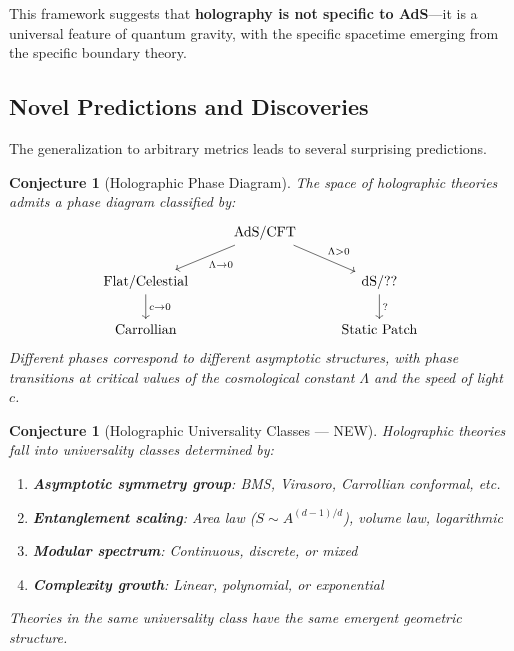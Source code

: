 \documentclass[12pt,a4paper]{article}
\newtheorem{conjecture}[theorem]{Conjecture}
\begin{document}
This framework suggests that \textbf{holography is not specific to AdS}---it is a universal feature of quantum gravity, with the specific spacetime emerging from the specific boundary theory.

\subsection{Novel Predictions and Discoveries}

The generalization to arbitrary metrics leads to several surprising predictions.

\begin{conjecture}[Holographic Phase Diagram]
The space of holographic theories admits a phase diagram classified by:
\begin{equation}
\begin{tikzcd}
& \text{AdS/CFT} \arrow[dl, "\Lambda \to 0"] \arrow[dr, "\Lambda > 0"] & \\
\text{Flat/Celestial} \arrow[d, "c \to 0"] & & \text{dS/??} \arrow[d, "?"] \\
\text{Carrollian} & & \text{Static Patch}
\end{tikzcd}
\end{equation}
Different phases correspond to different asymptotic structures, with phase transitions at critical values of the cosmological constant $\Lambda$ and the speed of light $c$.
\end{conjecture}

\begin{conjecture}[Holographic Universality Classes --- NEW]
Holographic theories fall into universality classes determined by:
\begin{enumerate}
    \item \textbf{Asymptotic symmetry group}: BMS, Virasoro, Carrollian conformal, etc.
    \item \textbf{Entanglement scaling}: Area law ($S \sim A^{(d-1)/d}$), volume law, logarithmic
    \item \textbf{Modular spectrum}: Continuous, discrete, or mixed
    \item \textbf{Complexity growth}: Linear, polynomial, or exponential
\end{enumerate}
Theories in the same universality class have the same emergent geometric structure.
\end{conjecture}
\end{document}
